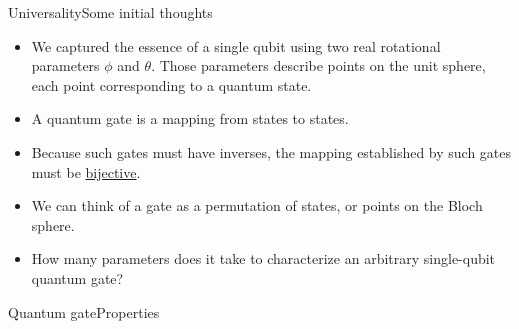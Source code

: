 
\begin{frame}{Universality}{Some initial thoughts}

\begin{itemize}[<+->]
    \item We captured the essence of a single qubit using two real rotational parameters $\phi$ and $\theta$.  Those parameters describe points on the unit sphere, each point corresponding to a quantum state.
    \item A quantum gate is a mapping from states to states.
    \item Because such gates must have inverses, the mapping established by such gates must be \href{https://en.wikipedia.org/wiki/Bijection}{bijective}.
    \item We can think of a gate as a permutation of states, or points on the Bloch sphere.
    \item How many parameters does it take to characterize an arbitrary single-qubit quantum gate?
\end{itemize}

    
\end{frame}

\begin{frame}{Quantum gate}{Properties}

\BigSkip{}
    
\end{frame}

